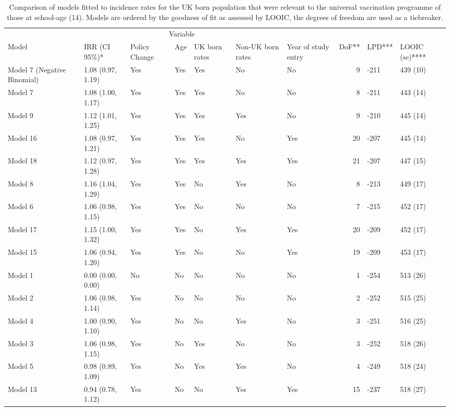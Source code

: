 \documentclass[11pt,twoside]{bristolthesis}
\begin{document}
\begin{landscape}
\begin{table}[!h]
  \caption{\label{tab:07-summary-universal-ukborn}Comparison of models fitted to incidence rates for the UK born population that were relevant to the universal vaccination programme of those at school-age (14). Models are ordered by the goodness of fit as assessed by LOOIC, the degrees of freedom are used as a tiebreaker.}
  \centering
  \fontsize{8}{10}\selectfont
  \begin{tabular}{>{\raggedright\arraybackslash}p{3cm}llllllrll}
  \toprule
  \multicolumn{2}{c}{ } & \multicolumn{5}{c}{Variable} & \multicolumn{3}{c}{ } \\
  \cmidrule(l{3pt}r{3pt}){3-7}
  Model & IRR (CI 95\%)* & Policy Change & Age & UK born rates & Non-UK born rates & Year of study entry & DoF** & LPD*** & LOOIC (se)****\\
  \midrule
  Model 7 (Negative Binomial) & 1.08 (0.97, 1.19) & Yes & Yes & Yes & No & No & 9 & -211 & 439 (10)\\
  Model 7 & 1.08 (1.00, 1.17) & Yes & Yes & Yes & No & No & 8 & -211 & 443 (14)\\
  Model 9 & 1.12 (1.01, 1.25) & Yes & Yes & Yes & Yes & No & 9 & -210 & 445 (14)\\
  Model 16 & 1.08 (0.97, 1.21) & Yes & Yes & Yes & No & Yes & 20 & -207 & 445 (14)\\
  Model 18 & 1.12 (0.97, 1.28) & Yes & Yes & Yes & Yes & Yes & 21 & -207 & 447 (15)\\
  \addlinespace
  Model 8 & 1.16 (1.04, 1.29) & Yes & Yes & No & Yes & No & 8 & -213 & 449 (17)\\
  Model 6 & 1.06 (0.98, 1.15) & Yes & Yes & No & No & No & 7 & -215 & 452 (17)\\
  Model 17 & 1.15 (1.00, 1.32) & Yes & Yes & No & Yes & Yes & 20 & -209 & 452 (17)\\
  Model 15 & 1.06 (0.94, 1.20) & Yes & Yes & No & No & Yes & 19 & -209 & 453 (17)\\
  Model 1 & 0.00 (0.00, 0.00) & No & No & No & No & No & 1 & -254 & 513 (26)\\
  \addlinespace
  Model 2 & 1.06 (0.98, 1.14) & Yes & No & No & No & No & 2 & -252 & 515 (25)\\
  Model 4 & 1.00 (0.90, 1.10) & Yes & No & No & Yes & No & 3 & -251 & 516 (25)\\
  Model 3 & 1.06 (0.98, 1.15) & Yes & No & Yes & No & No & 3 & -252 & 518 (26)\\
  Model 5 & 0.98 (0.89, 1.09) & Yes & No & Yes & Yes & No & 4 & -249 & 518 (24)\\
  Model 13 & 0.94 (0.78, 1.12) & Yes & No & No & Yes & Yes & 15 & -237 & 518 (27)\\

\end{tabular}
\end{table}
\end{landscape}
\end{document}
